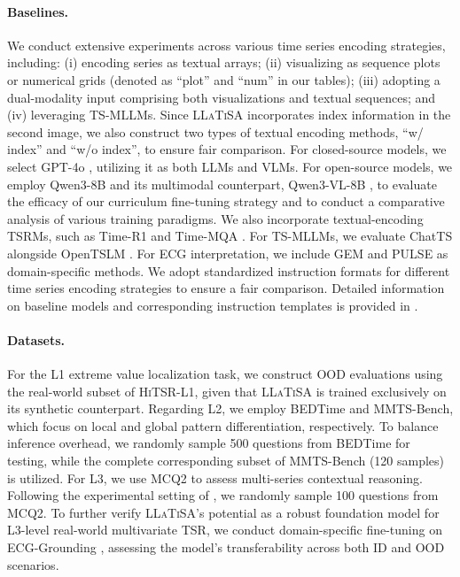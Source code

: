 \documentclass[11pt]{article}
\begin{document}
\paragraph{Baselines.} We conduct extensive experiments across various time series encoding strategies, including: (i) encoding series as textual arrays; (ii) visualizing as sequence plots or numerical grids (denoted as ``plot'' and ``num'' in our tables); (iii) adopting a dual-modality input comprising both visualizations and textual sequences; and (iv) leveraging TS-MLLMs.
Since \textsc{LLaTiSA} incorporates index information in the second image, we also construct two types of textual encoding methods, ``w/ index'' and ``w/o index'', to ensure fair comparison.
For closed-source models, we select GPT-4o \cite{gpt4}, utilizing it as both LLMs and VLMs. For open-source models, we employ Qwen3-8B \cite{qwen3} and its multimodal counterpart, Qwen3-VL-8B \cite{Qwen3-VL}, to evaluate the efficacy of our curriculum fine-tuning strategy and to conduct a comparative analysis of various training paradigms.
We also incorporate textual-encoding TSRMs, such as Time-R1 \cite{timer1} and Time-MQA \cite{timemqa}. 
For TS-MLLMs, we evaluate ChatTS \cite{chatts} alongside OpenTSLM \cite{opentslm}. For ECG interpretation, we include GEM \cite{ecgrounding} and PULSE \cite{pulse} as domain-specific methods. We adopt standardized instruction formats for different time series encoding strategies to ensure a fair comparison. Detailed information on baseline models and corresponding instruction templates is provided in .
\paragraph{Datasets.} 
For the L1 extreme value localization task, we construct OOD evaluations using the real-world subset of \textsc{HiTSR-L1}, given that \textsc{LLaTiSA} is trained exclusively on its synthetic counterpart.
Regarding L2, we employ BEDTime \cite{bedtime} and MMTS-Bench, which focus on local and global pattern differentiation, respectively. To balance inference overhead, we randomly sample 500 questions from BEDTime for testing, while the complete corresponding subset of MMTS-Bench (120 samples) is utilized.
For L3, we use MCQ2 \cite{mcq2} to assess multi-series contextual reasoning. 
Following the experimental setting of \cite{chatts}, we randomly sample 100 questions from MCQ2.
To further verify \textsc{LLaTiSA}'s potential as a robust foundation model for L3-level real-world multivariate TSR, we conduct domain-specific fine-tuning on ECG-Grounding \cite{ecgrounding}, assessing the model’s transferability across both ID and OOD scenarios.
\end{document}
